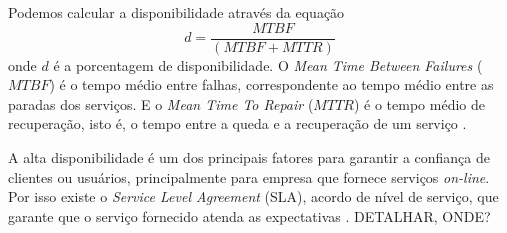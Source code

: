 Podemos calcular a disponibilidade através da equação
\begin{equation}
d = \frac{MTBF}{(MTBF + MTTR)}
\label{diponibilidade}
\end{equation}
onde $d$ é a porcentagem de disponibilidade. O \textit{Mean Time Between Failures} ($MTBF$) é o tempo médio entre falhas, correspondente ao tempo médio 
entre as paradas dos serviços. E o \textit{Mean Time To Repair} ($MTTR$) é o tempo médio de recuperação, isto é, o tempo 
entre a queda e a recuperação de um serviço \cite{goncalves2009}.

A alta disponibilidade é um dos principais fatores para garantir a confiança de clientes ou usuários, principalmente para empresa que 
fornece serviços \textit{on-line}. Por isso existe o \textit{Service Level Agreement} (SLA), acordo de nível de serviço, 
que garante que o serviço fornecido atenda as expectativas \cite{smith2010}. DETALHAR, ONDE?


